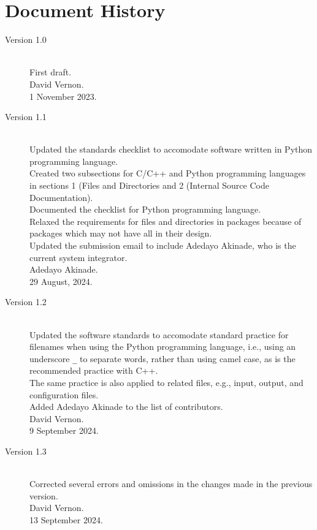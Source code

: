 \documentclass{CSSRforAfrica}
\begin{document}
  

\newpage
\section*{Document History}
\label{document_history}

\begin{description}

\item [Version 1.0]~\\
First draft. \\
David Vernon. \\                               
1 November 2023.      
 
\item [Version 1.1]~\\
Updated the standards checklist to accomodate software written in Python programming language. \\
Created two subsections for C/C++ and Python programming languages in sections 1 (Files and Directories and 2 (Internal Source Code Documentation).\\
Documented the checklist for Python programming language.\\
Relaxed the requirements for files and directories in packages because of packages which may not have all in their design. \\
Updated the submission email to include Adedayo Akinade, who is the current system integrator.\\
Adedayo Akinade. \\                               
29 August, 2024.   

\item [Version 1.2]~\\
Updated the software standards to accomodate standard practice for filenames when using the Python programming language, i.e., using an underscore {\small \verb+_+} to separate words, rather than using camel case, as is the recommended practice with C++.\\
The same practice is also applied to related files, e.g., input, output, and configuration files.\\
Added Adedayo Akinade to the list of contributors.\\     
David Vernon. \\       
9 September 2024. 

\item [Version 1.3]~\\
Corrected several errors and omissions in the changes made in the previous version.\\     
David Vernon. \\       
13 September 2024. 

\end{description}
\end{document}
